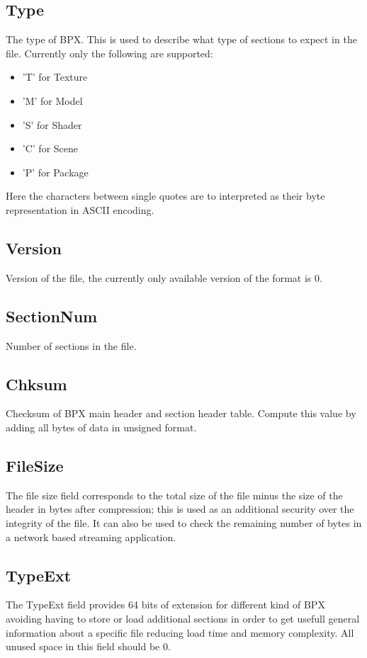 \subsection{Type}
The type of BPX. This is used to describe what type of sections to expect in the file.\newline
Currently only the following are supported:
\begin{itemize}
    \item 'T' for Texture
    \item 'M' for Model
    \item 'S' for Shader
    \item 'C' for Scene
    \item 'P' for Package
\end{itemize}
Here the characters between single quotes are to interpreted as their byte representation in ASCII encoding.

\subsection{Version}
Version of the file, the currently only available version of the format is 0.

\subsection{SectionNum}
Number of sections in the file.

\subsection{Chksum}
Checksum of BPX main header and section header table. Compute this value by adding all bytes of data in unsigned format.

\subsection{FileSize}
The file size field corresponds to the total size of the file minus the size of the header in bytes after compression; this is used as an additional security over the integrity of the file. It can also be used to check the remaining number of bytes in a network based streaming application.

\subsection{TypeExt}
The TypeExt field provides 64 bits of extension for different kind of BPX avoiding having to store or load additional sections in order to get usefull general information about a specific file reducing load time and memory complexity.\newline
All unused space in this field should be 0.
